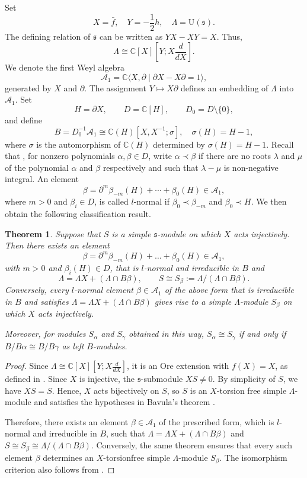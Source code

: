 \documentclass[a4paper,10pt]{article}
\theoremstyle{definition}
\theoremstyle{plain}
\newtheorem{theorem}[definition]{Theorem}
\theoremstyle{remark}
\theoremstyle{mystyle}
\numberwithin{equation}{section}
\begin{document}
Set
\[
X=\bar f,\quad Y=-\frac12h,
\quad \Lambda=\mathrm U(\mathfrak s).
\]
The defining relation of \(\mathfrak s\) can be written as $YX-XY=X$. Thus,
\[
\Lambda\cong\mathbb C[X]\left[Y;X\frac{d}{dX}\right].
\]
We denote the first Weyl algebra
\[
\mathcal{A}_1
=
\mathbb C\langle X,\partial
\mid \partial X-X\partial=1\rangle,
\]
generated by \(X\) and \(\partial\). The assignment $Y\mapsto X\partial$ defines an embedding of $\Lambda$ into $\mathcal A_1$.
Set
$$
H=\partial X,\qquad D=\mathbb C[H],\qquad D_0=D\setminus\{0\},
$$
and define
$$
B=D_0^{-1}\mathcal A_1\cong \mathbb C(H)[X,X^{-1};\sigma],
\quad \sigma(H)=H-1,
$$
where $\sigma$ is the automorphism of $\mathbb C(H)$ determined by $\sigma(H)=H-1$. 
Recall that \cite{Bavula2020}, for nonzero polynomials \(\alpha,\beta\in D\), write \(\alpha\prec\beta\) if there are no roots \(\lambda\) and \(\mu\) of the polynomial $\alpha$ and \(\beta\) respectively and such that $\lambda-\mu$ is non-negative integral. An element
\[
\beta=\partial^m\beta_{-m}(H)+\cdots+\beta_0(H)\in\mathcal A_1,
\]
where \(m>0\) and \(\beta_i\in D\), is called \(l\)-normal if $ \beta_0\prec\beta_{-m}$ and $\beta_0\prec H$.
We then obtain the following classification result.
\begin{theorem}\label{Bavula}
    Suppose that $S$ is a simple $\mathfrak s$-module on which $X$ acts injectively. Then there exists an element
    $$
    \beta=\partial^m \beta_{-m}(H)+\dots +\beta_0(H)\in \mathcal{A}_1,
    $$
    with $m>0$ and $\beta _i(H)\in D$, that is $l$-normal and irreducible in $B$ and 
    $$
    \Lambda=\Lambda X+(\Lambda \cap B\beta ),\qquad S\cong S_{\beta}:=\Lambda/(\Lambda\cap B\beta).
    $$
    Conversely, every \(l\)-normal element \(\beta\in \mathcal A_1\) of the above form that is irreducible in \(B\) and satisfies \(\Lambda=\Lambda X+(\Lambda\cap B\beta)\) gives rise to a simple \(\Lambda\)-module \(S_\beta\) on which \(X\) acts injectively.
    
    Moreover, for modules \(S_\alpha\) and \(S_\gamma\) obtained in this way, $S_\alpha\cong S_\gamma$ if and only if $B/B\alpha\cong B/B\gamma$ as left \(B\)-modules.
\end{theorem}
\begin{proof}
    Since $\Lambda\cong \mathbb C[X]\left[Y;X\frac{d}{dX}\right]$, it is an Ore extension with \(f(X)=X\), as defined in \cite{Bavula2020}. Since $X$ is injective, the $\mathfrak s$-submodule $XS\neq 0$. By simplicity of $S$, we have $XS=S$. Hence, \(X\) acts bijectively on \(S\), so \(S\) is an \(X\)-torsion free simple $\Lambda$-module and satisfies the hypotheses in Bavula's theorem \cite[Theorem 2.10]{Bavula2020}.
    
    Therefore, there exists an element \(\beta \in \mathcal{A}_1\) of the prescribed form, which is \(l\)-normal and irreducible in \(B\), such that $\Lambda=\Lambda X+(\Lambda\cap B\beta )$ and $S\cong S_{\beta }\cong\Lambda/(\Lambda\cap B\beta ).$ Conversely, the same theorem ensures that every such element \(\beta\) determines an \(X\)-torsionfree simple \(\Lambda\)-module \(S_\beta\). The isomorphism criterion also follows from \cite[Theorem 2.10]{Bavula2020}.
\end{proof}
\end{document}
